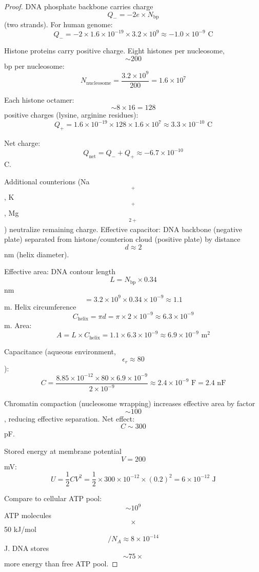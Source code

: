 \documentclass[11pt,twocolumn,a4paper]{article}
\theoremstyle{remark}
\begin{document}
\begin{proof}
DNA phosphate backbone carries charge $$Q_- = -2e \times N_{\mathrm{bp}}$$ (two strands). For human genome:
$$
Q_- = -2 \times 1.6 \times 10^{-19} \times 3.2 \times 10^9 \approx -1.0 \times 10^{-9} \text{ C}
$$

Histone proteins carry positive charge. Eight histones per nucleosome, $$\sim 200$$ bp per nucleosome:
$$
N_{\mathrm{nucleosome}} = \frac{3.2 \times 10^9}{200} = 1.6 \times 10^7
$$

Each histone octamer: $$\sim 8 \times 16 = 128$$ positive charges (lysine, arginine residues):
$$
Q_+ = 1.6 \times 10^{-19} \times 128 \times 1.6 \times 10^7 \approx 3.3 \times 10^{-10} \text{ C}
$$

Net charge: $$Q_{\mathrm{net}} = Q_- + Q_+ \approx -6.7 \times 10^{-10}$$ C.

Additional counterions (Na$$^+$$, K$$^+$$, Mg$$^{2+}$$) neutralize remaining charge. Effective capacitor: DNA backbone (negative plate) separated from histone/counterion cloud (positive plate) by distance $$d \approx 2$$ nm (helix diameter).

Effective area: DNA contour length $$L = N_{\mathrm{bp}} \times 0.34$$ nm $$= 3.2 \times 10^9 \times 0.34 \times 10^{-9} \approx 1.1$$ m. Helix circumference $$C_{\mathrm{helix}} = \pi d = \pi \times 2 \times 10^{-9} \approx 6.3 \times 10^{-9}$$ m. Area:
$$
A = L \times C_{\mathrm{helix}} = 1.1 \times 6.3 \times 10^{-9} \approx 6.9 \times 10^{-9} \text{ m}^2
$$

Capacitance (aqueous environment, $$\epsilon_r \approx 80$$):
$$
C = \frac{8.85 \times 10^{-12} \times 80 \times 6.9 \times 10^{-9}}{2 \times 10^{-9}} \approx 2.4 \times 10^{-9} \text{ F} = 2.4 \text{ nF}
$$

Chromatin compaction (nucleosome wrapping) increases effective area by factor $$\sim 100$$, reducing effective separation. Net effect: $$C \sim 300$$ pF.

Stored energy at membrane potential $$V = 200$$ mV:
$$
U = \frac{1}{2}CV^2 = \frac{1}{2} \times 300 \times 10^{-12} \times (0.2)^2 = 6 \times 10^{-12} \text{ J}
$$

Compare to cellular ATP pool: $$\sim 10^9$$ ATP molecules $$\times$$ 50 kJ/mol $$/ N_A \approx 8 \times 10^{-14}$$ J. DNA stores $$\sim 75\times$$ more energy than free ATP pool.
\end{proof}
\end{document}
